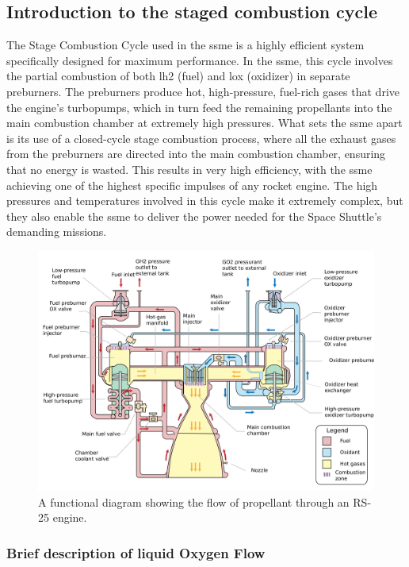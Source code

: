 \subsection{Introduction to the staged combustion cycle}
The Stage Combustion Cycle used in the \acrfull{ssme} is a highly efficient system specifically designed for maximum performance.
In the \acrshort{ssme}, this cycle involves the partial combustion of both \acrlong{lh2} (fuel) and \acrlong{lox} (oxidizer) in separate preburners. 
The preburners produce hot, high-pressure, fuel-rich gases that drive the engine's turbopumps, which in turn feed the remaining propellants into the main combustion chamber at extremely high pressures.
What sets the \acrshort{ssme} apart is its use of a closed-cycle stage combustion process, where all the exhaust gases from the preburners are directed into the main combustion chamber, ensuring that no energy is wasted.
This results in very high efficiency, with the \acrshort{ssme} achieving one of the highest specific impulses of any rocket engine.
The high pressures and temperatures involved in this cycle make it extremely complex, but they also enable the \acrshort{ssme} to deliver the power needed for the Space Shuttle's demanding missions.
\begin{figure}[H]
	\centering
 \includegraphics[width=.550\textwidth]{ssme_ciclo}
	\caption{A functional diagram showing the flow of propellant through an RS-25 engine.}
	\label{fig:ssme_cycle}
\end{figure}



\subsubsection{Brief description of liquid Oxygen Flow}


